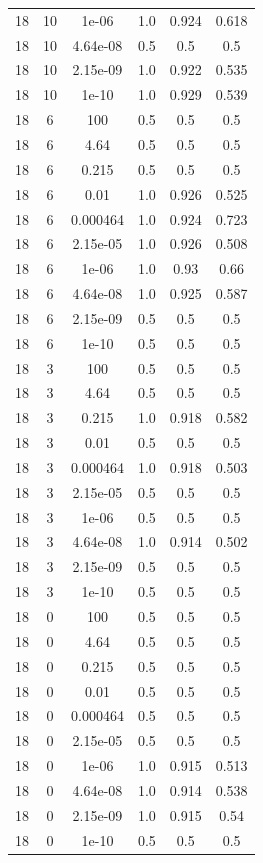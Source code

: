 \begin{table}[ht]
\begin{tabular}{ |c|c|c|c|c|c| }
18 & 10 & 1e-06 & 1.0 & 0.924 & 0.618 \\
18 & 10 & 4.64e-08 & 0.5 & 0.5 & 0.5 \\
18 & 10 & 2.15e-09 & 1.0 & 0.922 & 0.535 \\
18 & 10 & 1e-10 & 1.0 & 0.929 & 0.539 \\
18 & 6 & 100 & 0.5 & 0.5 & 0.5 \\
18 & 6 & 4.64 & 0.5 & 0.5 & 0.5 \\
18 & 6 & 0.215 & 0.5 & 0.5 & 0.5 \\
18 & 6 & 0.01 & 1.0 & 0.926 & 0.525 \\
18 & 6 & 0.000464 & 1.0 & 0.924 & 0.723 \\
18 & 6 & 2.15e-05 & 1.0 & 0.926 & 0.508 \\
18 & 6 & 1e-06 & 1.0 & 0.93 & 0.66 \\
18 & 6 & 4.64e-08 & 1.0 & 0.925 & 0.587 \\
18 & 6 & 2.15e-09 & 0.5 & 0.5 & 0.5 \\
18 & 6 & 1e-10 & 0.5 & 0.5 & 0.5 \\
18 & 3 & 100 & 0.5 & 0.5 & 0.5 \\
18 & 3 & 4.64 & 0.5 & 0.5 & 0.5 \\
18 & 3 & 0.215 & 1.0 & 0.918 & 0.582 \\
18 & 3 & 0.01 & 0.5 & 0.5 & 0.5 \\
18 & 3 & 0.000464 & 1.0 & 0.918 & 0.503 \\
18 & 3 & 2.15e-05 & 0.5 & 0.5 & 0.5 \\
18 & 3 & 1e-06 & 0.5 & 0.5 & 0.5 \\
18 & 3 & 4.64e-08 & 1.0 & 0.914 & 0.502 \\
18 & 3 & 2.15e-09 & 0.5 & 0.5 & 0.5 \\
18 & 3 & 1e-10 & 0.5 & 0.5 & 0.5 \\
18 & 0 & 100 & 0.5 & 0.5 & 0.5 \\
18 & 0 & 4.64 & 0.5 & 0.5 & 0.5 \\
18 & 0 & 0.215 & 0.5 & 0.5 & 0.5 \\
18 & 0 & 0.01 & 0.5 & 0.5 & 0.5 \\
18 & 0 & 0.000464 & 0.5 & 0.5 & 0.5 \\
18 & 0 & 2.15e-05 & 0.5 & 0.5 & 0.5 \\
18 & 0 & 1e-06 & 1.0 & 0.915 & 0.513 \\
18 & 0 & 4.64e-08 & 1.0 & 0.914 & 0.538 \\
18 & 0 & 2.15e-09 & 1.0 & 0.915 & 0.54 \\
18 & 0 & 1e-10 & 0.5 & 0.5 & 0.5 \\

\end{tabular}
\end{table}
